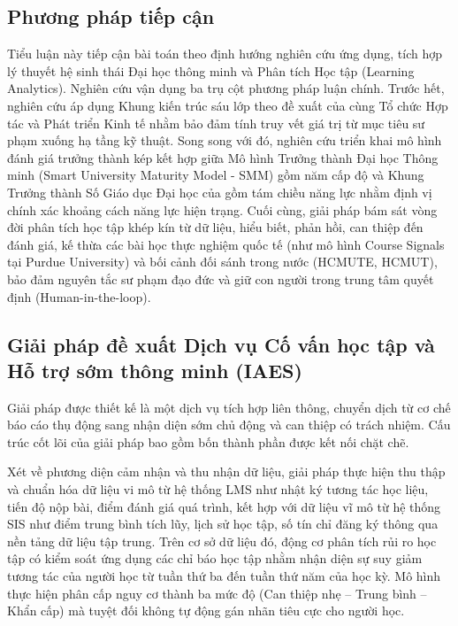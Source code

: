 \subsection*{Phương pháp tiếp cận}
Tiểu luận này tiếp cận bài toán theo định hướng nghiên cứu ứng dụng, tích hợp lý thuyết hệ sinh thái Đại học thông minh và Phân tích Học tập (Learning Analytics). Nghiên cứu vận dụng ba trụ cột phương pháp luận chính. Trước hết, nghiên cứu áp dụng Khung kiến trúc sáu lớp theo đề xuất của \citet{uskov2018} cùng Tổ chức Hợp tác và Phát triển Kinh tế \citep{oecd2023} nhằm bảo đảm tính truy vết giá trị từ mục tiêu sư phạm xuống hạ tầng kỹ thuật. Song song với đó, nghiên cứu triển khai mô hình đánh giá trưởng thành kép kết hợp giữa Mô hình Trưởng thành Đại học Thông minh (Smart University Maturity Model - SMM) gồm năm cấp độ và Khung Trưởng thành Số Giáo dục Đại học của \citet{amiri2026} gồm tám chiều năng lực nhằm định vị chính xác khoảng cách năng lực hiện trạng. Cuối cùng, giải pháp bám sát vòng đời phân tích học tập khép kín từ dữ liệu, hiểu biết, phản hồi, can thiệp đến đánh giá, kế thừa các bài học thực nghiệm quốc tế (như mô hình Course Signals tại Purdue University) và bối cảnh đối sánh trong nước (HCMUTE, HCMUT), bảo đảm nguyên tắc sư phạm đạo đức và giữ con người trong trung tâm quyết định (Human-in-the-loop).

\subsection*{Giải pháp đề xuất Dịch vụ Cố vấn học tập và Hỗ trợ sớm thông minh (IAES)}
Giải pháp được thiết kế là một dịch vụ tích hợp liên thông, chuyển dịch từ cơ chế báo cáo thụ động sang nhận diện sớm chủ động và can thiệp có trách nhiệm. Cấu trúc cốt lõi của giải pháp bao gồm bốn thành phần được kết nối chặt chẽ.

Xét về phương diện cảm nhận và thu nhận dữ liệu, giải pháp thực hiện thu thập và chuẩn hóa dữ liệu vi mô từ hệ thống LMS như nhật ký tương tác học liệu, tiến độ nộp bài, điểm đánh giá quá trình, kết hợp với dữ liệu vĩ mô từ hệ thống SIS như điểm trung bình tích lũy, lịch sử học tập, số tín chỉ đăng ký thông qua nền tảng dữ liệu tập trung. Trên cơ sở dữ liệu đó, động cơ phân tích rủi ro học tập có kiểm soát ứng dụng các chỉ báo học tập nhằm nhận diện sự suy giảm tương tác của người học từ tuần thứ ba đến tuần thứ năm của học kỳ. Mô hình thực hiện phân cấp nguy cơ thành ba mức độ (Can thiệp nhẹ -- Trung bình -- Khẩn cấp) mà tuyệt đối không tự động gán nhãn tiêu cực cho người học. 

